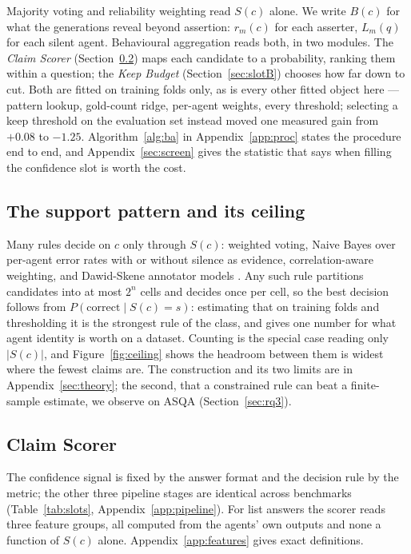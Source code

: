 \documentclass{article}
\begin{document}
Majority voting and reliability weighting read $S(c)$ alone. We write $B(c)$ for what the generations reveal beyond assertion: $r_m(c)$ for each asserter, $L_m(q)$ for each silent agent. Behavioural aggregation reads both, in two modules. The \emph{Claim Scorer} (Section~\ref{sec:slotA}) maps each candidate to a probability, ranking them within a question; the \emph{Keep Budget} (Section~\ref{sec:slotB}) chooses how far down to cut. Both are fitted on training folds only, as is every other fitted object here --- pattern lookup, gold-count ridge, per-agent weights, every threshold; selecting a keep threshold on the evaluation set instead moved one measured gain from $+0.08$ to $-1.25$. %
 Algorithm~\ref{alg:ba} in Appendix~\ref{app:proc} states the procedure end to end, and Appendix~\ref{sec:screen} gives the statistic that says when filling the confidence slot is worth the cost.

\subsection{The support pattern and its ceiling}
\label{sec:ceiling}

Many rules decide on $c$ only through $S(c)$: weighted voting, Naive Bayes over per-agent error rates with or without silence as evidence, correlation-aware weighting, and Dawid-Skene annotator models \cite{dawid1979maximum}. Any such rule partitions candidates into at most $2^n$ cells and decides once per cell, so the best decision follows from $P(\mathrm{correct} \mid S(c) = s)$: estimating that on training folds and thresholding it is the strongest rule of the class, and gives one number for what agent identity is worth on a dataset. Counting is the special case reading only $|S(c)|$, and Figure~\ref{fig:ceiling} shows the headroom between them is widest where the fewest claims are. The construction and its two limits are in Appendix~\ref{sec:theory}; the second, that a constrained rule can beat a finite-sample estimate, we observe on ASQA (Section~\ref{sec:rq3}).


\subsection{Claim Scorer}
\label{sec:slotA}

The confidence signal is fixed by the answer format and the decision rule by the metric; the other three pipeline stages are identical across benchmarks (Table~\ref{tab:slots}, Appendix~\ref{app:pipeline}). For list answers the scorer reads three feature groups, all computed from the agents' own outputs and none a function of $S(c)$ alone. Appendix~\ref{app:features} gives exact definitions.
\end{document}
